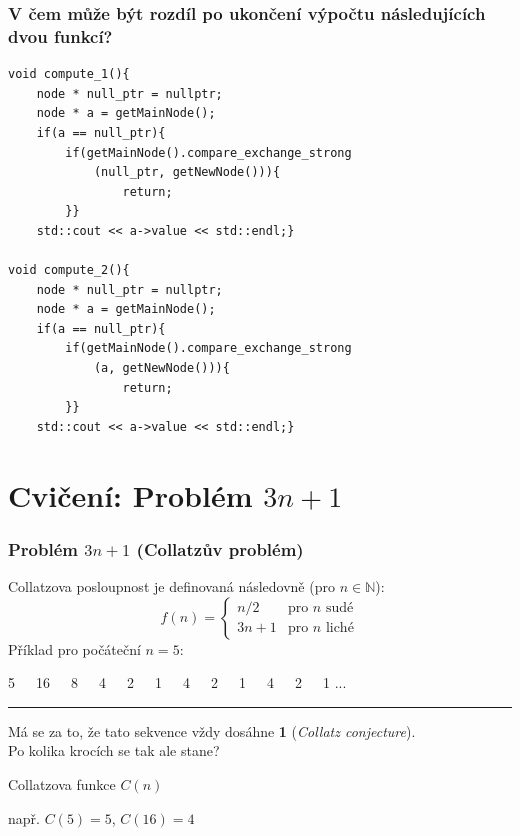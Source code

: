 \documentclass[usenames,dvipsnames,9pt]{beamer}
\begin{document}
\begin{frame}[fragile]

\frametitle{V čem může být rozdíl po ukončení výpočtu následujících dvou funkcí?}

	\begin{verbatim}
void compute_1(){
	node * null_ptr = nullptr;
	node * a = getMainNode();
	if(a == null_ptr){
		if(getMainNode().compare_exchange_strong
			(null_ptr, getNewNode())){ 
				return;
		}}
	std::cout << a->value << std::endl;}
	
void compute_2(){
	node * null_ptr = nullptr;
	node * a = getMainNode();
	if(a == null_ptr){
		if(getMainNode().compare_exchange_strong
			(a, getNewNode())){ 
				return;
		}}
	std::cout << a->value << std::endl;}
	\end{verbatim}

\end{frame}

\section{Cvičení: Problém $3n+1$}

\begin{frame}
	\frametitle{Problém $3n+1$ (Collatzův problém)}
	Collatzova posloupnost je definovaná následovně (pro $n \in \mathbb{N}$):
	\[
		f(n) = \begin{cases}
			n/2  & \text{pro $n$ sudé} \\
			3n+1 & \text{pro $n$ liché}
		\end{cases}
	\]
	Příklad pro počáteční $n=5$:
	\begin{center}
		\LARGE 5\ \ \  16\ \ \  8\ \ \  4\ \ \  2\ \ \  1\ \ \  4\ \ \  2\ \ \  1\ \ \  4\ \ \  2\ \ \  1 ...
	\end{center}

	\pause

	\vspace{1em}\hrule\vspace{1em}

	Má se za to, že tato sekvence vždy dosáhne \textbf{1} (\emph{Collatz conjecture}).\\
	Po kolika krocích se tak ale stane?

	{
		\hfill
		\Large Collatzova funkce $C(n)$
	}

	{
		\hfill
		např. $C(5)=5$, $C(16)=4$
	}

\end{frame}
\end{document}
